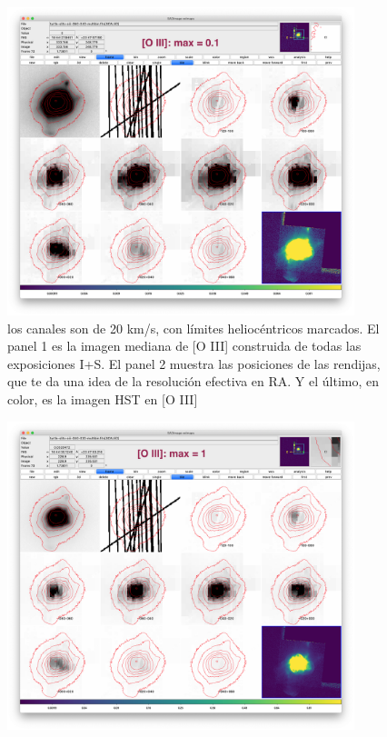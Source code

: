 \documentclass{aa}
\begin{document}
\begin{figure}[!t]
\centering
\includegraphics[width=0.9\textwidth]{turtle-oiii-faint.png}
  \caption{ los canales son de 20 km/s, con límites heliocéntricos marcados.  El panel 1 es la imagen mediana de [O III] construida de todas las exposiciones I+S. El panel 2 muestra las posiciones de las rendijas, que te da una idea de la resolución efectiva en RA.  Y el último, en color, es la imagen HST en [O III] }
\end{figure}


\begin{figure}[!t]
\centering
\includegraphics[width=0.9\textwidth]{turtle-oiii-medium.png}
  \caption{  }
\end{figure}
\end{document}
